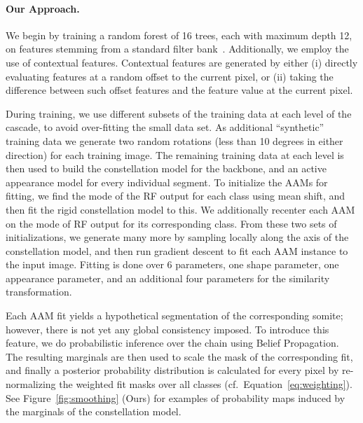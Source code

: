 \documentclass[10pt,twocolumn,letterpaper]{article}
\begin{document}
\paragraph{Our Approach. }

We begin by training a random forest of 16 trees, each with maximum depth 12, on features stemming from a standard filter bank~\cite{hall2009weka}.  Additionally, we employ the use of contextual features. 
Contextual features are generated by either (i) directly evaluating features at a random offset to the current pixel, or (ii) taking the difference between such offset features and the feature value at the current pixel.  

During training, we use different subsets of the training data at each level of the cascade, to avoid over-fitting the small data set. As additional ``synthetic'' training data we generate two random rotations (less than 10 degrees in either direction) for each training image.  The remaining training data at each level is then used to build the constellation model for the backbone, and an active appearance model for every individual segment.  To initialize the AAMs for fitting, we find the mode of the RF output for each class using mean shift, and then fit the rigid constellation model to this.  We additionally recenter each AAM on the mode of RF output for its corresponding class.  From these two sets of initializations, we generate many more by sampling locally along the axis of the constellation model, and then run gradient descent to fit each AAM instance to the input image.  Fitting is done over 6 parameters, one shape parameter, one appearance parameter, and an additional four parameters for the similarity transformation.

Each AAM fit yields a hypothetical segmentation of the corresponding somite; however, there is not yet any global consistency imposed.  To introduce this feature, we do probabilistic inference over the chain using Belief Propagation.  The resulting marginals are then used to scale the mask of the corresponding fit, and finally a posterior probability distribution is calculated for every pixel by re-normalizing the weighted fit masks over all classes (cf.\ Equation~\eqref{eq:weighting}).  See Figure~\ref{fig:smoothing} (Ours) for examples of probability maps induced by the marginals of the constellation model.
\end{document}
